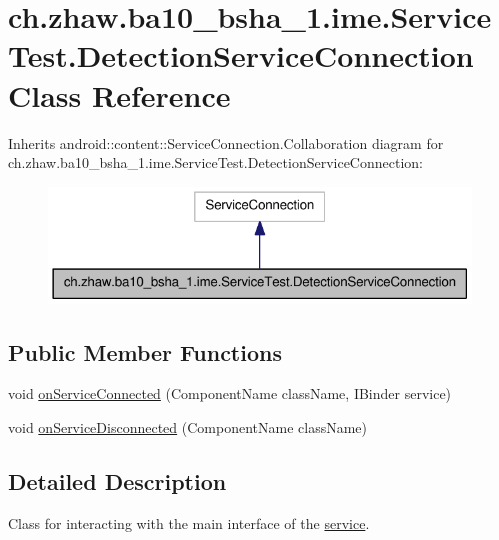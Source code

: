 \hypertarget{classch_1_1zhaw_1_1ba10__bsha__1_1_1ime_1_1ServiceTest_1_1DetectionServiceConnection}{
\section{ch.zhaw.ba10\_\-bsha\_\-1.ime.ServiceTest.DetectionServiceConnection Class Reference}
\label{classch_1_1zhaw_1_1ba10__bsha__1_1_1ime_1_1ServiceTest_1_1DetectionServiceConnection}
}


Inherits android::content::ServiceConnection.Collaboration diagram for ch.zhaw.ba10\_\-bsha\_\-1.ime.ServiceTest.DetectionServiceConnection:\nopagebreak
\begin{figure}[H]
\begin{center}
\leavevmode
\includegraphics[width=356pt]{classch_1_1zhaw_1_1ba10__bsha__1_1_1ime_1_1ServiceTest_1_1DetectionServiceConnection__coll__graph}
\end{center}
\end{figure}
\subsection*{Public Member Functions}
\begin{DoxyCompactItemize}
\item 
void \hyperlink{classch_1_1zhaw_1_1ba10__bsha__1_1_1ime_1_1ServiceTest_1_1DetectionServiceConnection_a52d46455b7ea802c55717fe7b5f51759}{onServiceConnected} (ComponentName className, IBinder service)
\item 
void \hyperlink{classch_1_1zhaw_1_1ba10__bsha__1_1_1ime_1_1ServiceTest_1_1DetectionServiceConnection_a308b18246d990cb67a51836ba8ea9f05}{onServiceDisconnected} (ComponentName className)
\end{DoxyCompactItemize}


\subsection{Detailed Description}
Class for interacting with the main interface of the \hyperlink{namespacech_1_1zhaw_1_1ba10__bsha__1_1_1service}{service}. 

